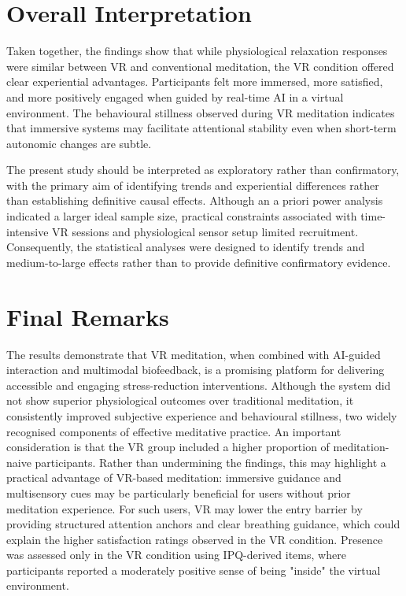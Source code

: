 \section*{Overall Interpretation}

Taken together, the findings show that while physiological relaxation responses
were similar between VR and conventional meditation, the VR condition offered
clear experiential advantages. Participants felt more immersed, more satisfied,
and more positively engaged when guided by real-time AI in a virtual environment. The behavioural stillness observed during VR meditation indicates
that immersive systems may facilitate attentional stability even when
short-term autonomic changes are subtle.

The present study should be interpreted as exploratory rather than confirmatory, with the primary aim of identifying trends and experiential differences rather than establishing definitive causal effects. Although an a priori power analysis indicated a larger ideal sample size, practical constraints associated with time-intensive VR sessions and physiological sensor setup limited recruitment. Consequently, the statistical analyses were designed to identify trends and medium-to-large effects rather than to provide definitive confirmatory evidence.

\section*{Final Remarks}

The results demonstrate that VR meditation, when combined with AI-guided interaction and multimodal biofeedback, is a promising platform for delivering accessible and engaging stress-reduction interventions. Although the system did not show superior physiological outcomes over traditional meditation, it consistently improved subjective experience and behavioural stillness, two widely recognised components of effective meditative practice. An important consideration is that the VR group included a higher proportion of meditation-naive participants. Rather than undermining the findings, this may highlight a practical advantage of VR-based
meditation: immersive guidance and multisensory cues may be particularly
beneficial for users without prior meditation experience. For such users,
VR may lower the entry barrier by providing structured attention anchors
and clear breathing guidance, which could explain the higher satisfaction ratings observed in the VR condition.
Presence was assessed only in the VR condition using IPQ-derived items, where participants reported a moderately positive sense of being "inside" the virtual environment.

